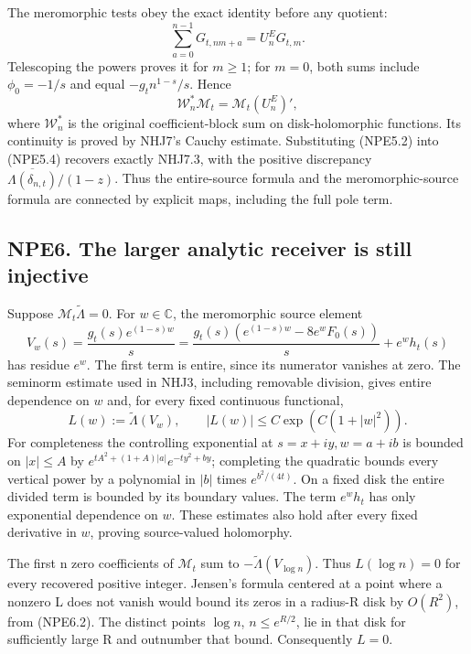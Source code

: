 The meromorphic tests obey the exact identity before any quotient: \[
\sum_{a=0}^{n-1}G_{t,nm+a}=U_n^E G_{t,m}.
\tag{NPE5.5}
\] Telescoping the powers proves it for \(m\ge1\); for \(m=0\), both
sums include \(\phi_0=-1/s\) and equal \(-g_t n^{1-s}/s\). Hence \[
\boxed{\mathscr W_n^*\mathcal M_t=\mathcal M_t(U_n^E)'},
\tag{NPE5.6}
\] where \(\mathscr W_n^*\) is the original coefficient-block sum on
disk-holomorphic functions. Its continuity is proved by NHJ7's Cauchy
estimate. Substituting (NPE5.2) into (NPE5.4) recovers exactly NHJ7.3,
with the positive discrepancy
\(\overline{\Lambda(\delta_{n,t})}/(1-z)\). Thus the entire-source
formula and the meromorphic-source formula are connected by explicit
maps, including the full pole term.

\subsection{NPE6. The larger analytic receiver is still
injective}\label{npe6.-the-larger-analytic-receiver-is-still-injective}

Suppose \(\mathcal M_t\widetilde\Lambda=0\). For \(w\in\mathbb C\), the
meromorphic source element \[
V_w(s)=\frac{g_t(s)e^{(1-s)w}}s
=\frac{g_t(s)(e^{(1-s)w}-8e^wF_0(s))}s+e^wh_t(s)
\tag{NPE6.1}
\] has residue \(e^w\). The first term is entire, since its numerator
vanishes at zero. The seminorm estimate used in NHJ3, including
removable division, gives entire dependence on \(w\) and, for every
fixed continuous functional, \[
L(w):=\widetilde\Lambda(V_w),\qquad
|L(w)|\le C\exp(C(1+|w|^2)).
\tag{NPE6.2}
\] For completeness the controlling exponential at \(s=x+iy,w=a+ib\) is
bounded on \(|x|\le A\) by \(e^{tA^2+(1+A)|a|}e^{-ty^2+by}\); completing
the quadratic bounds every vertical power by a polynomial in \(|b|\)
times \(e^{b^2/(4t)}\). On a fixed disk the entire divided term is
bounded by its boundary values. The term \(e^wh_t\) has only exponential
dependence on \(w\). These estimates also hold after every fixed
derivative in \(w\), proving source-valued holomorphy.

The first n zero coefficients of \(\mathcal M_t\) sum to
\(-\widetilde\Lambda(V_{\log n})\). Thus \(L(\log n)=0\) for every
recovered positive integer. Jensen's formula centered at a point where a
nonzero L does not vanish would bound its zeros in a radius-R disk by
\(O(R^2)\), from (NPE6.2). The distinct points \(\log n\),
\(n\le e^{R/2}\), lie in that disk for sufficiently large R and
outnumber that bound. Consequently \(L=0\).

